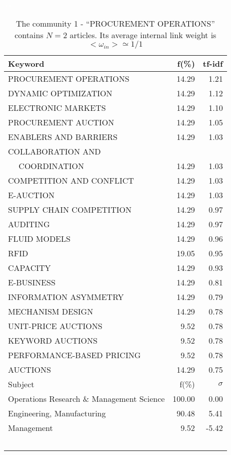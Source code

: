 \documentclass[a4paper,11pt]{report}
\begin{document}
\begin{landscape}
\clearpage

\begin{table}[!ht]
\caption{The community 1 - ``PROCUREMENT OPERATIONS'' contains $N = 2$ articles. Its average internal link weight is $<\omega_{in}> \simeq 1/1$ }
\textcolor{white}{aa}\\
{\scriptsize\begin{tabular}{|l r  r|}
\hline
Keyword & f(\%) & tf-idf \\
\hline
PROCUREMENT OPERATIONS & 14.29 & 1.21\\
DYNAMIC OPTIMIZATION & 14.29 & 1.12\\
ELECTRONIC MARKETS & 14.29 & 1.10\\
PROCUREMENT AUCTION & 14.29 & 1.05\\
ENABLERS AND BARRIERS & 14.29 & 1.03\\
COLLABORATION AND &  &\\
$\quad$ COORDINATION & 14.29 & 1.03\\
COMPETITION AND CONFLICT & 14.29 & 1.03\\
E-AUCTION & 14.29 & 1.03\\
SUPPLY CHAIN COMPETITION & 14.29 & 0.97\\
AUDITING & 14.29 & 0.97\\
FLUID MODELS & 14.29 & 0.96\\
RFID & 19.05 & 0.95\\
CAPACITY & 14.29 & 0.93\\
E-BUSINESS & 14.29 & 0.81\\
INFORMATION ASYMMETRY & 14.29 & 0.79\\
MECHANISM DESIGN & 14.29 & 0.78\\
UNIT-PRICE AUCTIONS & 9.52 & 0.78\\
KEYWORD AUCTIONS & 9.52 & 0.78\\
PERFORMANCE-BASED PRICING & 9.52 & 0.78\\
AUCTIONS & 14.29 & 0.75\\
\hline
\hline
Subject & f(\%) & $\sigma$\\
\hline
Operations Research \& Management Science & 100.00 & 0.00\\
Engineering, Manufacturing & 90.48 & 5.41\\
Management & 9.52 & -5.42\\
 &  & \\
 &  & \\
 &  & \\
 &  & \\
 &  & \\

\end{tabular}}
\end{table}
\end{landscape}
\end{document}
